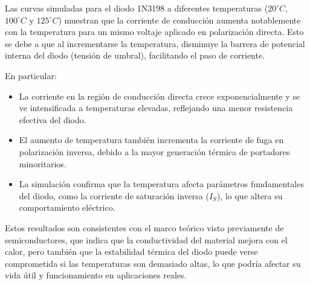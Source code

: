 Las curvas simuladas para el diodo 1N3198 a diferentes temperaturas ($20^\circ C$, $100^\circ C$ y $125^\circ C$) muestran que la corriente de conducción aumenta notablemente con la temperatura para un mismo voltaje aplicado en polarización directa. Esto se debe a que al incrementarse la temperatura, disminuye la barrera de potencial interna del diodo (tensión de umbral), facilitando el paso de corriente.

En particular:

\begin{itemize}
  \item La corriente en la región de conducción directa crece exponencialmente y se ve intensificada a temperaturas elevadas, reflejando una menor resistencia efectiva del diodo.
  \item El aumento de temperatura también incrementa la corriente de fuga en polarización inversa, debido a la mayor generación térmica de portadores minoritarios.
  \item La simulación confirma que la temperatura afecta parámetros fundamentales del diodo, como la corriente de saturación inversa ($I_S$), lo que altera su comportamiento eléctrico.
\end{itemize}

Estos resultados son consistentes con el marco teórico visto previamente de semiconductores, que indica que la conductividad del material mejora con el calor, pero también que la estabilidad térmica del diodo puede verse comprometida si las temperaturas son demasiado altas, lo que podría afectar su vida útil y funcionamiento en aplicaciones reales.


